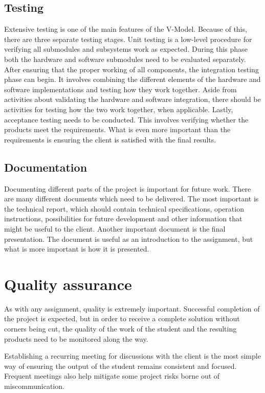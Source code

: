 \documentclass{report}
\begin{document}
	\section{Testing}
	Extensive testing is one of the main features of the V-Model. Because of this, there are three separate testing stages. Unit testing is a low-level procedure for verifying all submodules and subsystems work as expected. During this phase both the hardware and software submodules need to be evaluated separately. After ensuring that the proper working of all components, the integration testing phase can begin. It involves combining the different elements of the hardware and software implementations and testing how they work together. Aside from activities about validating the hardware and software integration, there should be activities for testing how the two work together, when applicable. Lastly, acceptance testing needs to be conducted. This involves verifying whether the products meet the requirements. What is even more important than the requirements is ensuring the client is satisfied with the final results.
	
	\section{Documentation}
	Documenting different parts of the project is important for future work. There are many different documents which need to be delivered. The most important is the technical report, which should contain technical specifications, operation instructions, possibilities for future development and other information that might be useful to the client. Another important document is the final presentation. The document is useful as an introduction to the assignment, but what is more important is how it is presented. 
	
	
	\chapter{Quality assurance}\label{quality_assurance}
	As with any assignment, quality is extremely important. Successful completion of the project is expected, but in order to receive a complete solution without corners being cut, the quality of the work of the student and the resulting products need to be monitored along the way.
	
	Establishing a recurring meeting for discussions with the client is the most simple way of ensuring the output of the student remains consistent and focused. Frequent meetings also help mitigate some project risks borne out of miscommunication.
	
\end{document}
